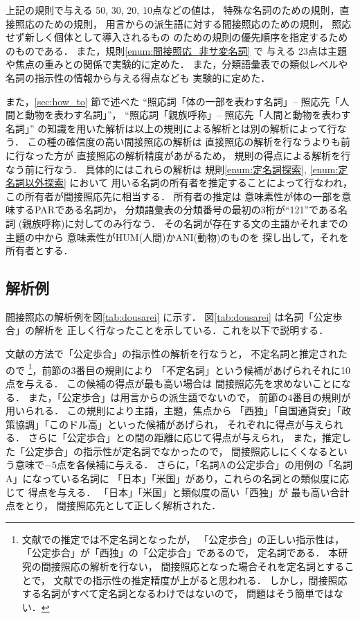 上記の規則で与える 50, 30, 20, 10点などの値は，
特殊な名詞のための規則，直接照応のための規則，
用言からの派生語に対する間接照応のための規則，
照応せず新しく個体として導入されるもの
のための規則の優先順序を指定するためのものである．
また，規則\ref{enum:間接照応_非サ変名詞} で
与える 23点は主題や焦点の重みとの関係で実験的に定めた．
また，分類語彙表での類似レベルや名詞の指示性の情報から与える得点なども
実験的に定めた．

また，\ref{sec:how_to} 節で述べた
``照応詞「体の一部を表わす名詞」-- 照応先「人間と動物を表わす名詞」''，
``照応詞「親族呼称」-- 照応先「人間と動物を表わす名詞」''
の知識を用いた解析は以上の規則による解析とは別の解析によって行なう．
この種の確信度の高い間接照応の解析は
直接照応の解析を行なうよりも前に行なった方が
直接照応の解析精度があがるため，
規則の得点による解析を行なう前に行なう．
具体的にはこれらの解析は
規則\ref{enum:定名詞探索}, \ref{enum:定名詞以外探索} において
用いる名詞の所有者を推定することによって行なわれ，
この所有者が間接照応先に相当する．
所有者の推定は
意味素性が体の一部を意味するPARである名詞か，
分類語彙表の分類番号の最初の3桁が``121''である名詞
(親族呼称)に対してのみ行なう．
その名詞が存在する文の主語かそれまでの主題の中から
意味素性がHUM(人間)かANI(動物)のものを
探し出して，それを所有者とする．


\subsection{解析例}

間接照応の解析例を図\ref{tab:dousarei} に示す．
図\ref{tab:dousarei} は名詞「公定歩合」の解析を
正しく行なったことを示している．これを以下で説明する．

文献\cite{match}の方法で「公定歩合」の指示性の解析を行なうと，
不定名詞と推定されたので
\footnote{
  文献\cite{match}での推定では不定名詞となったが，
  「公定歩合」の正しい指示性は，
  「公定歩合」が「西独」の「公定歩合」であるので，
  定名詞である．
  本研究の間接照応の解析を行ない，
  間接照応となった場合それを定名詞とすることで，
  文献\cite{match}での指示性の推定精度が上がると思われる．
  しかし，間接照応する名詞がすべて定名詞となるわけではないので，
  問題はそう簡単ではない．
}，前節の3番目の規則により
「不定名詞」という候補があげられそれに10点を与える．
この候補の得点が最も高い場合は
間接照応先を求めないことになる．
また，「公定歩合」は用言からの派生語でないので，
前節の4番目の規則が用いられる．
この規則により主語，主題，焦点から
「西独」「自国通貨安」「政策協調」「このドル高」といった候補があげられ，
それぞれに得点が与えられる．
さらに「公定歩合」との間の距離に応じて得点が与えられ，
また，推定した「公定歩合」の指示性が定名詞でなかったので，
間接照応しにくくなるという意味で$-5$点を各候補に与える．
さらに，「名詞Aの公定歩合」の用例の「名詞A」になっている名詞に
「日本」「米国」があり，これらの名詞との類似度に応じて
得点を与える．
「日本」「米国」と類似度の高い「西独」が
最も高い合計点をとり，
間接照応先として正しく解析された．

